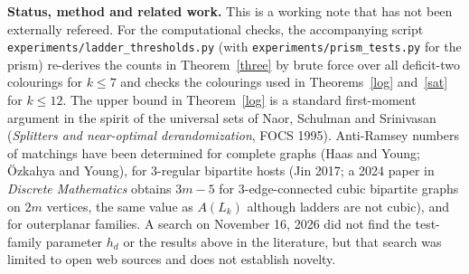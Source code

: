 \documentclass[11pt]{article}
\theoremstyle{remark}
\begin{document}
\bigskip\small\noindent
\textbf{Status, method and related work.}
This is a working note that has not been externally refereed. For the computational checks, the accompanying script
\texttt{experiments/ladder\_thresholds.py} (with \texttt{experiments/prism\_tests.py} for the prism) re-derives the counts in
Theorem~\ref{three} by brute force over all deficit-two colourings for
\(k\le7\) and checks the colourings used in Theorems~\ref{log}
and~\ref{sat} for \(k\le12\). The upper bound in Theorem~\ref{log} is a
standard first-moment argument in the spirit of the universal sets of
Naor, Schulman and Srinivasan (\emph{Splitters and near-optimal
derandomization}, FOCS 1995). Anti-Ramsey numbers of matchings have been
determined for complete graphs (Haas and Young; \"Ozkahya and Young), for
3-regular bipartite hosts (Jin 2017; a 2024 paper in \emph{Discrete
Mathematics} obtains \(3m-5\) for 3-edge-connected cubic bipartite graphs on
\(2m\) vertices, the same value as \(A(L_k)\) although ladders are not
cubic), and for outerplanar families. A search on November 16, 2026 did not
find the test-family parameter \(h_d\) or the results above in the
literature, but that search was limited to open web sources and does not
establish novelty.
\end{document}
